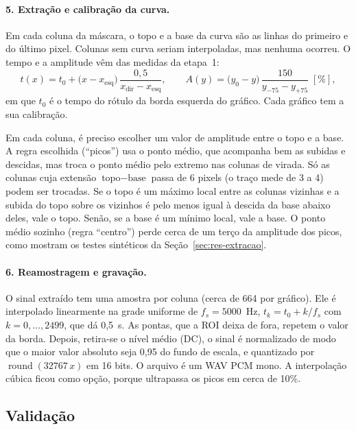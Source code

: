 \paragraph{5. Extração e calibração da curva.}
Em cada coluna da máscara, o topo e a base da curva são as linhas do primeiro e do último pixel. Colunas sem curva seriam interpoladas, mas nenhuma ocorreu. O tempo e a amplitude vêm das medidas da etapa~1:
\begin{equation}
t(x)=t_0+\bigl(x-x_{\text{esq}}\bigr)\,\frac{0{,}5}{x_{\text{dir}}-x_{\text{esq}}},\qquad
A(y)=\bigl(y_0-y\bigr)\,\frac{150}{y_{-75}-y_{+75}}\;[\%],
\end{equation}
em que $t_0$ é o tempo do rótulo da borda esquerda do gráfico. Cada gráfico tem a sua calibração.

Em cada coluna, é preciso escolher um valor de amplitude entre o topo e a base. A regra escolhida (``picos'') usa o ponto médio, que acompanha bem as subidas e descidas, mas troca o ponto médio pelo extremo nas colunas de virada. Só as colunas cuja extensão $\text{topo}-\text{base}$ passa de 6 pixels (o traço mede de 3 a 4) podem ser trocadas. Se o topo é um máximo local entre as colunas vizinhas e a subida do topo sobre os vizinhos é pelo menos igual à descida da base abaixo deles, vale o topo. Senão, se a base é um mínimo local, vale a base. O ponto médio sozinho (regra ``centro'') perde cerca de um terço da amplitude dos picos, como mostram os testes sintéticos da Seção~\ref{sec:res-extracao}.

\paragraph{6. Reamostragem e gravação.}
O sinal extraído tem uma amostra por coluna (cerca de 664 por gráfico). Ele é interpolado linearmente na grade uniforme de $f_s=5000$~Hz, $t_k=t_0+k/f_s$ com $k=0,\dots,2499$, que dá 0,5~s. As pontas, que a ROI deixa de fora, repetem o valor da borda. Depois, retira-se o nível médio (DC), o sinal é normalizado de modo que o maior valor absoluto seja 0,95 do fundo de escala, e quantizado por $\operatorname{round}(32767\,x)$ em 16 bits. O arquivo é um WAV PCM mono. A interpolação cúbica ficou como opção, porque ultrapassa os picos em cerca de 10\%.

\subsection{Validação}

